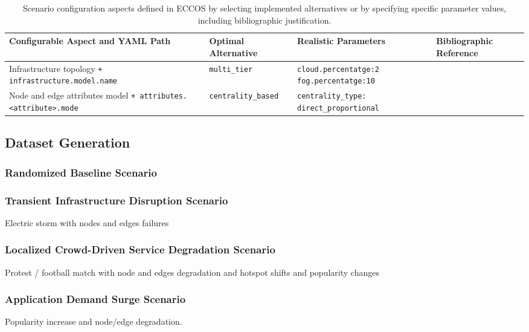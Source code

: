 \documentclass[ASNA]{USG} %
\begin{document}
\begin{table}[!ht]
\caption{Scenario configuration aspects defined in \textsc{ECCOS} by selecting implemented alternatives or by specifying specific parameter values, including bibliographic justification.}
\label{tab:configurable_alternatives}
\begin{tabular*}{\textwidth}{@{\extracolsep\fill}p{6.2cm} p{2.2cm} p{2.8cm} p{2.5cm}@{\extracolsep\fill}}
\toprule
\textbf{Configurable Aspect and YAML Path} & \textbf{Optimal Alternative} & \textbf{Realistic Parameters} & \textbf{Bibliographic Reference} \\
\midrule

Infrastructure topology \newline \texttt{+ infrastructure.model.name} & \texttt{multi\_tier} & \texttt{cloud.percentatge:2} \newline \texttt{fog.percentatge:10} & \cite{7931566,10.1145/513800.513811,10.1145/316188.316229,587723,10.5555/882459.882563} \\
\midrule
Node and edge attributes model \newline \texttt{+  attributes.<attribute>.mode} & \texttt{centrality\_based} & \texttt{centrality\_type: direct\_proportional} & \cite{PhysRevLett.87.278701} \\
\bottomrule
\end{tabular*}
\end{table}


\subsection{Dataset Generation}

\subsubsection{Randomized Baseline Scenario}
\subsubsection{Transient Infrastructure Disruption Scenario}
Electric storm with nodes and edges failures
\subsubsection{Localized Crowd-Driven Service Degradation Scenario}
Protest / football match with node and edges degradation and hotspot shifts and popularity changes
\subsubsection{Application Demand Surge Scenario}
Popularity increase and node/edge degradation.
\end{document}

